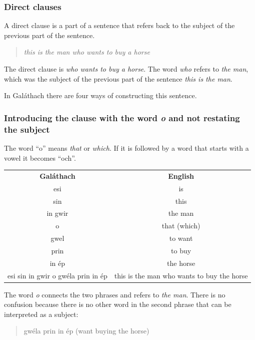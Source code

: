 \subsubsection{Direct clauses}
A direct clause is a part of a sentence that refers back to the subject of the previous part of the sentence.

\begin{quote}
  \textit{this is the man who wants to buy a horse}
\end{quote}

The direct clause is \textit{who wants to buy a horse}. The word \textit{who} refers to \textit{the man}, which was the subject of the previous part of the sentence \textit{this is the man}.

In Gal\'{a}thach there are four ways of constructing this sentence.

\subsubsection{Introducing the clause with the word \textit{o} and not restating the subject}

The word ``o'' means \textit{that} or \textit{which}. If it is followed by a word that starts with a vowel it becomes ``och''.

\begin{table}[H]
\centering
\begin{tabular}{cc}
  \toprule
  \textbf{Gal\'{a}thach} & \textbf{English}\\
  \cmidrule(lr){1-1}\cmidrule(lr){2-2}
  esi & is\\
  sin & this\\
  in gwir & the man\\
  o & that (which)\\
  gwel & to want\\
  prin & to buy\\
  in \'{e}p & the horse\\
  esi sin in gwir o gw\'{e}la prin in \'{e}p & this is the man who wants to buy the horse\\
  \bottomrule
\end{tabular}
\label{examples_way1}
\end{table}

The word \textit{o} connects the two phrases and refers to \textit{the man}. There is no confusion because there is no other word in the second phrase that can be interpreted as a subject:

\begin{quote}
gw\'{e}la prin in \'{e}p (want buying the horse)
\end{quote}

